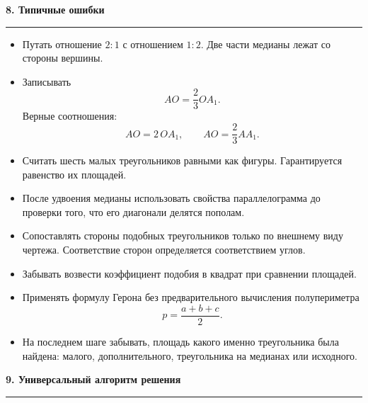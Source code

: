 \documentclass[a4paper,12pt]{article}
\newcommand{\checksection}[1]{%
  \vspace{0.7em}%
  {\Large\bfseries\color{darkaccent}#1}\par
  \vspace{0.25em}
  {\color{rulegray}\rule{\linewidth}{0.6pt}}\par
  \vspace{0.5em}
}
\begin{document}

\checksection{8. Типичные ошибки}

\begin{itemize}

  \item
  Путать отношение $2:1$ с отношением $1:2$.
  Две части медианы лежат со стороны вершины.

  \item
  Записывать
  \[
  AO=\frac23OA_1.
  \]
  Верные соотношения:
  \[
  AO=2\,OA_1,
  \qquad
  AO=\frac23AA_1.
  \]

  \item
  Считать шесть малых треугольников равными как фигуры.
  Гарантируется равенство их площадей.

  \item
  После удвоения медианы использовать свойства
  параллелограмма до проверки того, что его диагонали
  делятся пополам.

  \item
  Сопоставлять стороны подобных треугольников только по
  внешнему виду чертежа. Соответствие сторон определяется
  соответствием углов.

  \item
  Забывать возвести коэффициент подобия в квадрат при
  сравнении площадей.

  \item
  Применять формулу Герона без предварительного вычисления
  полупериметра
  \[
  p=\frac{a+b+c}{2}.
  \]

  \item
  На последнем шаге забывать, площадь какого именно
  треугольника была найдена: малого, дополнительного,
  треугольника на медианах или исходного.

\end{itemize}


\checksection{9. Универсальный алгоритм решения}
\end{document}
